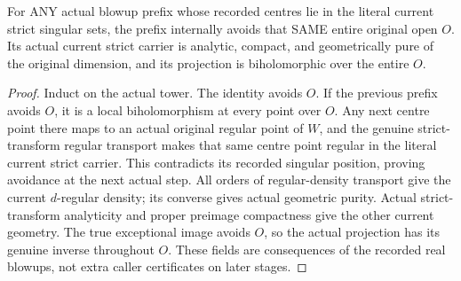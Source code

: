 \begin{lemma}
\label{hir:actual-recorded-singular-prefix-current-geometry}
\leanok
For ANY actual blowup prefix whose recorded centres lie in the literal current
strict singular sets, the prefix internally avoids that SAME entire original
open $O$. Its actual current strict carrier is analytic, compact, and
geometrically pure of the original dimension, and its projection is
biholomorphic over the entire $O$.
\end{lemma}
\begin{proof}
Induct on the actual tower. The identity avoids $O$. If the previous prefix
avoids $O$, it is a local biholomorphism at every point over $O$. Any next
centre point there maps to an actual original regular point of $W$, and
the genuine strict-transform regular transport makes that same centre point
regular in the literal current strict carrier. This contradicts its recorded
singular position, proving avoidance at the next actual step. All orders of
regular-density transport give the current $d$-regular density; its converse
gives actual geometric purity. Actual strict-transform analyticity and proper
preimage compactness give the other current geometry. The true exceptional
image avoids $O$, so the actual projection has its genuine inverse throughout
$O$. These fields are consequences of the recorded real blowups, not extra
caller certificates on later stages.
\end{proof}

